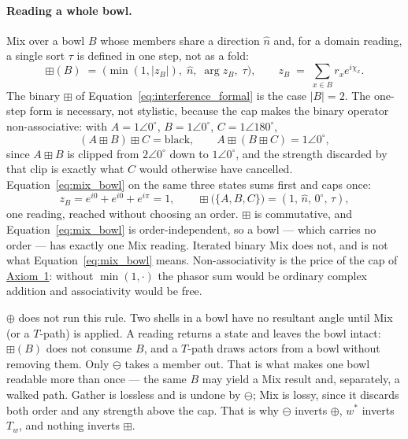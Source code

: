 \documentclass[12pt, a4paper]{article}
\begin{document}
\paragraph{Reading a whole bowl.}
Mix over a bowl $B$ whose members share a direction $\hat n$ and, for
a domain reading, a single sort $\tau$ is
defined in one step, not as a fold:
\begin{equation}
    \boxplus(B)
    \;=\;
    \bigl(\min(1,|z_B|),\;\hat n,\;\arg z_B,\;\tau\bigr),
    \qquad
    z_B \;=\; \sum_{x\in B} r_x e^{i\chi_x}.
    \label{eq:mix_bowl}
\end{equation}
The binary $\boxplus$ of Equation~\eqref{eq:interference_formal} is
the case $|B|=2$. The one-step form is necessary, not stylistic,
because the cap makes the binary operator non-associative: with
$A=1\angle 0^\circ$, $B=1\angle 0^\circ$, $C=1\angle 180^\circ$,
\[
(A\boxplus B)\boxplus C=\text{black},
\qquad
A\boxplus(B\boxplus C)=1\angle 0^\circ ,
\]
since $A\boxplus B$ is clipped from $2\angle 0^\circ$ down to
$1\angle 0^\circ$, and the strength discarded by that clip is exactly
what $C$ would otherwise have cancelled.
Equation~\eqref{eq:mix_bowl} on the same three states sums first and
caps once:
\[
z_B = e^{i0}+e^{i0}+e^{i\pi} = 1,
\qquad
\boxplus\bigl(\{A,B,C\}\bigr) = (1,\,\hat n,\,0^\circ,\,\tau),
\]
one reading, reached without choosing an order. $\boxplus$ is
commutative,
and Equation~\eqref{eq:mix_bowl} is order-independent, so a bowl ---
which carries no order --- has exactly one Mix reading. Iterated
binary Mix does not, and is not what
Equation~\eqref{eq:mix_bowl} means. Non-associativity is the price of
the cap of \hyperref[subsec:axiom1]{Axiom~1}: without $\min(1,\cdot)$ the
phasor sum would be ordinary complex addition and associativity would
be free.

$\oplus$ does not run this rule. Two shells in a bowl have no
resultant angle until Mix (or a $T$-path) is applied.
A reading returns a state and leaves the bowl intact: $\boxplus(B)$
does not consume $B$, and a $T$-path draws actors from a bowl without
removing them. Only $\ominus$ takes a member out. That is what makes
one bowl readable more than once --- the same $B$ may yield a Mix
result and, separately, a walked path.
Gather is lossless and is undone by $\ominus$; Mix is lossy, since it
discards both order and any strength above the cap. That is why
$\ominus$ inverts $\oplus$, $w^{*}$ inverts $T_w$, and nothing inverts
$\boxplus$.
\end{document}
